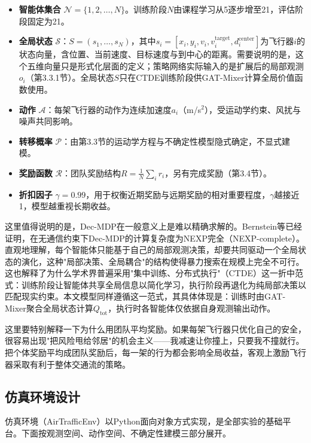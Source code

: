 \documentclass[12pt,a4paper,UTF8]{ctexart}
\begin{document}
\begin{itemize}
    \item \textbf{智能体集合} $\mathcal{N} = \{1, 2, \ldots, N\}$。训练阶段$N$由课程学习从5逐步增至21，评估阶段固定为21。
    \item \textbf{全局状态} $\mathcal{S}$：$S = (s_1, \ldots, s_N)$，其中$s_i = [x_i, y_i, v_i, v_i^{\text{target}}, d_i^{\text{center}}]$为飞行器$i$的状态向量，含位置、当前速度、目标速度与到中心的距离。需要说明的是，这个五维向量只是形式化层面的定义；策略网络实际输入的是扩展后的局部观测$o_i$（第3.3.1节）。全局状态$S$只在CTDE训练阶段供GAT-Mixer计算全局价值函数使用。
    \item \textbf{动作} $\mathcal{A}$：每架飞行器的动作为连续加速度$a_i$（m/s$^2$），受运动学约束、风扰与噪声共同影响。
    \item \textbf{转移概率} $\mathcal{P}$：由第3.3节的运动学方程与不确定性模型隐式确定，不显式建模。
    \item \textbf{奖励函数} $\mathcal{R}$：团队奖励结构$R = \frac{1}{N}\sum_i r_i$，另有完成奖励（第3.4节）。
    \item \textbf{折扣因子} $\gamma = 0.99$，用于权衡近期奖励与远期奖励的相对重要程度，$\gamma$越接近1，模型越重视长期收益。
\end{itemize}

这里值得说明的是，Dec-MDP在一般意义上是难以精确求解的。Bernstein等\cite{ref41}已经证明，在无通信约束下Dec-MDP的计算复杂度为NEXP完全（NEXP-complete）。直观地理解，每个智能体只能基于自己的局部观测决策，却要共同驱动一个全局状态的演化，这种"局部决策、全局耦合"的结构使得暴力搜索在规模上完全不可行。这也解释了为什么学术界普遍采用"集中训练、分布式执行"（CTDE）这一折中范式：训练阶段让智能体共享全局信息以简化学习，执行阶段再退化为纯局部决策以匹配现实约束。本文模型同样遵循这一范式，其具体体现是：训练时由GAT-Mixer聚合全局状态计算$Q_{\text{tot}}$，执行时各智能体仅依据自身观测输出动作。

这里要特别解释一下为什么用团队平均奖励。如果每架飞行器只优化自己的安全，很容易出现"把风险甩给邻居"的机会主义——我减速让你撞上，只要我不撞就行。把个体奖励平均成团队奖励后，每一架的行为都会影响全局收益，客观上激励飞行器采取有利于整体交通流的策略。

\subsection{仿真环境设计}

仿真环境（AirTrafficEnv）以Python面向对象方式实现，是全部实验的基础平台。下面按观测空间、动作空间、不确定性建模三部分展开。
\end{document}
